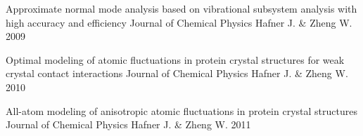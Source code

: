 


\begin{cvhonors}
\cvhonor
    {Approximate normal mode analysis based on vibrational subsystem analysis with high accuracy and efficiency}
    {Journal of Chemical Physics}
    {Hafner J. \& Zheng W.}
    {2009}

\cvhonor
    {Optimal modeling of atomic fluctuations in protein crystal structures for weak crystal contact interactions}
    {Journal of Chemical Physics}
    {Hafner J. \& Zheng W.}
    {2010}

\cvhonor
    {All-atom modeling of anisotropic atomic fluctuations in protein crystal structures}
    {Journal of Chemical Physics}
    {Hafner J. \& Zheng W.}
    {2011}

\end{cvhonors}


